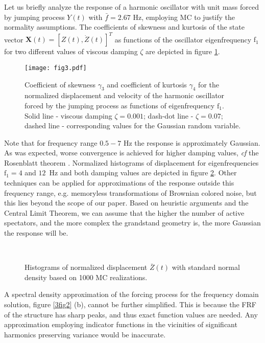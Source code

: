 \documentclass[preprint,12pt,authoryear]{elsarticle}
\newcommand{\bs}[1]{{\boldsymbol{#1}}}
\begin{document}
Let us briefly analyze the response of a harmonic oscillator with unit mass forced by jumping process $Y(t)$ with $\bar{f}=2.67$ Hz, employing MC to justify the normality assumptions. The coefficients of skewness and kurtosis of the state vector $\bs{X}(t)=[Z(t),\dot{Z}(t)]^T$ as functions of the oscillator eigenfrequency $\mbox{f}_1$ for two different values of viscous damping $\zeta$ are depicted in figure \ref{3fig3}.
\begin{figure}
	\centering
  \texttt{[image: fig3.pdf]}
	\caption{Coefficient of skewness $\gamma_3$ and coefficient of kurtosis $\gamma_4$ for the normalized displacement and velocity of the harmonic oscillator forced by the jumping process as functions of eigenfrequency $\mbox{f}_1$. Solid line - viscous damping $\zeta=0.001$; dash-dot line - $\zeta=0.07$; dashed line - corresponding values for the Gaussian random variable.}
	\label{3fig3}
\end{figure}
Note that for frequency range $0.5-7$ Hz the response is approximately Gaussian. As was expected, worse convergence is achieved for higher damping values, \textit{cf} the Rosenblatt theorem \citep{Grigoriu_nong}. Normalized histograms of displacement for eigenfrequencies $\mbox{f}_1=4$ and $12$~Hz and both damping values are depicted in figure \ref{3fig4}. Other techniques can be applied for approximations of the response outside this frequency range, e.g. memoryless transformations of Brownian colored noise, but this lies beyond the scope of our paper. Based on heuristic arguments and the Central Limit Theorem, we can assume that the higher the number of active spectators, and the more complex the grandstand geometry is, the more Gaussian the response will be.

\begin{figure}
	\centering
  \\
	\caption{Histograms of normalized displacement $\bar{Z}(t)$ with standard normal density based on 1000 MC realizations.}
	\label{3fig4}
\end{figure}


A spectral density approximation of the forcing process for the frequency domain solution, figure \ref{3fig2} (b), cannot be further simplified. This is because the FRF of the structure has sharp peaks, and thus exact function values are needed. Any approximation employing indicator functions in the vicinities of significant harmonics preserving variance would be inaccurate.
\end{document}
